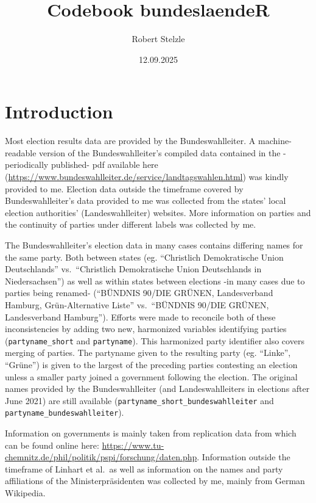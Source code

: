 \documentclass[
]{scrartcl}
\title{Codebook bundeslaendeR}
\author{Robert Stelzle}
\date{12.09.2025}
\begin{document}
\maketitle

{
\hypersetup{linkcolor=}
\setcounter{tocdepth}{1}
\tableofcontents
}
\clearpage

\hypersetup{colorlinks=true, allcolors=Nettrot}

\section{Introduction}\label{introduction}

Most election results data are provided by the Bundeswahlleiter. A
machine-readable version of the Bundeswahlleiter's compiled data
contained in the -periodically published- pdf available here
(\url{https://www.bundeswahlleiter.de/service/landtagswahlen.html}) was
kindly provided to me. Election data outside the timeframe covered by
Bundeswahlleiter's data provided to me was collected from the states'
local election authorities' (Landeswahlleiter) websites. More
information on parties and the continuity of parties under different
labels was collected by me.

The Bundeswahlleiter's election data in many cases contains differing
names for the same party. Both between states (eg. ``Christlich
Demokratische Union Deutschlands'' vs.~``Christlich Demokratische Union
Deutschlands in Niedersachsen'') as well as within states between
elections -in many cases due to parties being renamed- (``BÜNDNIS 90/DIE
GRÜNEN, Landesverband Hamburg, Grün-Alternative Liste'' vs.~``BÜNDNIS
90/DIE GRÜNEN, Landesverband Hamburg''). Efforts were made to reconcile
both of these inconsistencies by adding two new, harmonized variables
identifying parties (\texttt{partyname\_short} and \texttt{partyname}).
This harmonized party identifier also covers merging of parties. The
partyname given to the resulting party (eg. ``Linke'', ``Grüne'') is
given to the largest of the preceding parties contesting an election
unless a smaller party joined a government following the election. The
original names provided by the Bundeswahlleiter (and Landeswahlleiters
in elections after June 2021) are still available
(\texttt{partyname\_short\_bundeswahlleiter} and
\texttt{partyname\_bundeswahlleiter}).

Information on governments is mainly taken from replication data from
\textcite{linhartProportionaleMinisterienaufteilungDeutschen2008} which
can be found online here:
\url{https://www.tu-chemnitz.de/phil/politik/pspi/forschung/daten.php}.
Information outside the timeframe of Linhart et al.~as well as
information on the names and party affiliations of the
Ministerpräsidenten was collected by me, mainly from German Wikipedia.
\end{document}
